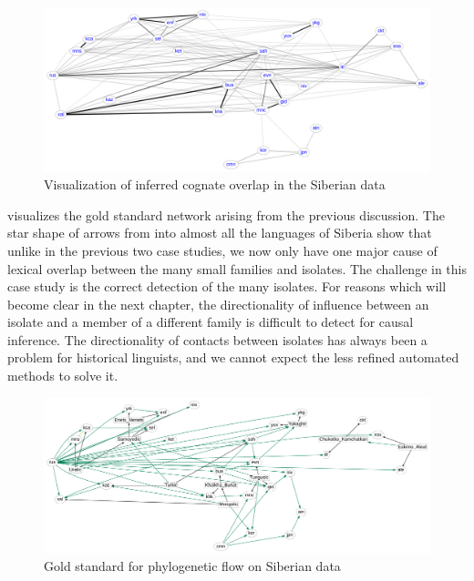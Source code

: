 \begin{figure}
\includegraphics[width=\textwidth]{figures/cognacy-strength-siberia.pdf}
\caption{Visualization of inferred cognate overlap in the Siberian data}
\label{siberia-cognacy}
\end{figure}

 visualizes the gold standard network arising from the previous discussion. The star shape of arrows from  into almost all the languages of Siberia show that unlike in the previous two case studies, we now only have one major cause of lexical overlap between the many small families and isolates. The challenge in this case study is the correct detection of the many isolates. For reasons which will become clear in the next chapter, the directionality of influence between an isolate and a member of a different family is difficult to detect for causal inference. The directionality of contacts between isolates has always been a problem for historical linguists, and we cannot expect the less refined automated methods to solve it.

\begin{figure}
\includegraphics[width=\textwidth]{figures/goldstandard-phylo-siberia.pdf}
\caption{Gold standard for phylogenetic flow on Siberian data}
\label{siberia-goldstandard-phylo}
\end{figure}

